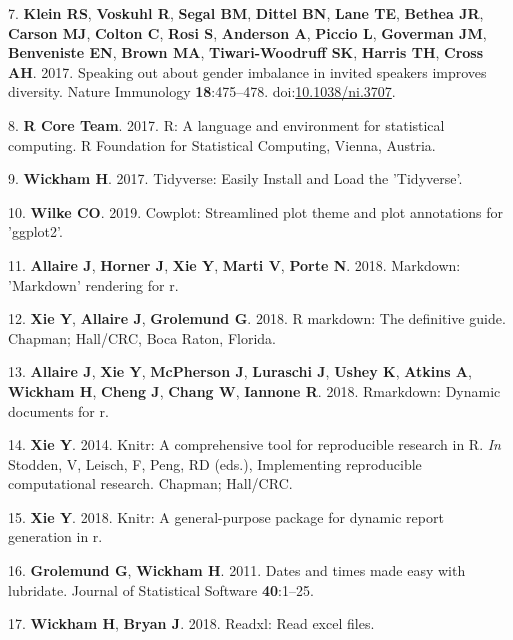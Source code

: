 \documentclass[10pt,]{article}
\begin{document}
\hypertarget{ref-klein_speaking_2017}{}
7. \textbf{Klein RS}, \textbf{Voskuhl R}, \textbf{Segal BM},
\textbf{Dittel BN}, \textbf{Lane TE}, \textbf{Bethea JR}, \textbf{Carson
MJ}, \textbf{Colton C}, \textbf{Rosi S}, \textbf{Anderson A},
\textbf{Piccio L}, \textbf{Goverman JM}, \textbf{Benveniste EN},
\textbf{Brown MA}, \textbf{Tiwari-Woodruff SK}, \textbf{Harris TH},
\textbf{Cross AH}. 2017. Speaking out about gender imbalance in invited
speakers improves diversity. Nature Immunology \textbf{18}:475--478.
doi:\href{https://doi.org/10.1038/ni.3707}{10.1038/ni.3707}.

\hypertarget{ref-R_software_2017}{}
8. \textbf{R Core Team}. 2017. R: A language and environment for
statistical computing. R Foundation for Statistical Computing, Vienna,
Austria.

\hypertarget{ref-wickham_tidyverse_2017}{}
9. \textbf{Wickham H}. 2017. Tidyverse: Easily Install and Load the
'Tidyverse'.

\hypertarget{ref-cowplot}{}
10. \textbf{Wilke CO}. 2019. Cowplot: Streamlined plot theme and plot
annotations for 'ggplot2'.

\hypertarget{ref-markdown}{}
11. \textbf{Allaire J}, \textbf{Horner J}, \textbf{Xie Y}, \textbf{Marti
V}, \textbf{Porte N}. 2018. Markdown: 'Markdown' rendering for r.

\hypertarget{ref-rmd_book}{}
12. \textbf{Xie Y}, \textbf{Allaire J}, \textbf{Grolemund G}. 2018. R
markdown: The definitive guide. Chapman; Hall/CRC, Boca Raton, Florida.

\hypertarget{ref-rmd_rstudio}{}
13. \textbf{Allaire J}, \textbf{Xie Y}, \textbf{McPherson J},
\textbf{Luraschi J}, \textbf{Ushey K}, \textbf{Atkins A},
\textbf{Wickham H}, \textbf{Cheng J}, \textbf{Chang W}, \textbf{Iannone
R}. 2018. Rmarkdown: Dynamic documents for r.

\hypertarget{ref-knitr_2014}{}
14. \textbf{Xie Y}. 2014. Knitr: A comprehensive tool for reproducible
research in R. \emph{In} Stodden, V, Leisch, F, Peng, RD (eds.),
Implementing reproducible computational research. Chapman; Hall/CRC.

\hypertarget{ref-knitr_2018}{}
15. \textbf{Xie Y}. 2018. Knitr: A general-purpose package for dynamic
report generation in r.

\hypertarget{ref-lubridate}{}
16. \textbf{Grolemund G}, \textbf{Wickham H}. 2011. Dates and times made
easy with lubridate. Journal of Statistical Software \textbf{40}:1--25.

\hypertarget{ref-readxl}{}
17. \textbf{Wickham H}, \textbf{Bryan J}. 2018. Readxl: Read excel
files.
\end{document}
